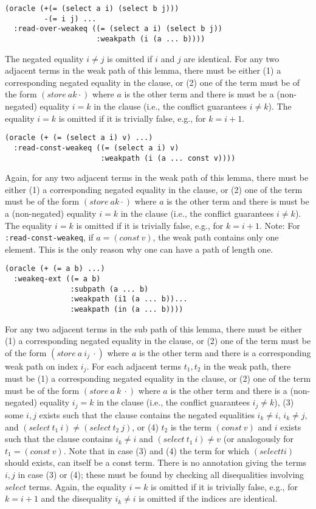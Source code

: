 \documentclass[a4paper]{article}
\begin{document}
\begin{verbatim}
(oracle (+(= (select a i) (select b j)))
         -(= i j) ...
  :read-over-weakeq ((= (select a i) (select b j))
                     :weakpath (i (a ... b))))
\end{verbatim}
The negated equality $i\neq j$ is omitted if $i$ and $j$ are identical.
For any two adjacent terms in the weak path of this lemma, there must be either
(1) a corresponding negated equality in the clause, or (2) one of the term must be of
the form $(store\ a k \cdot)$ where $a$ is the other term and there is must be
a (non-negated) equality $i=k$ in the clause (i.e., the conflict guarantees $i\neq k$).
The equality $i=k$ is omitted if it is trivially false, e.g., for $k = i+1$.

\begin{verbatim}
(oracle (+ (= (select a i) v) ...)
  :read-const-weakeq ((= (select a i) v)
                      :weakpath (i (a ... const v))))
\end{verbatim}
Again, for any two adjacent terms in the weak path of this lemma, there must be either
(1) a corresponding negated equality in the clause, or (2) one of the term must be of
the form $(store\ a k \cdot)$ where $a$ is the other term and there is must be
a (non-negated) equality $i=k$ in the clause (i.e., the conflict guarantees $i\neq k$).
The equality $i=k$ is omitted if it is trivially false, e.g., for $k = i+1$.
Note: For \verb+:read-const-weakeq+, if $a = (const\ v)$, the weak path
contains only one element.  This is the only reason why one can have a
path of length one.
\begin{verbatim}
(oracle (+ (= a b) ...)
  :weakeq-ext ((= a b)
               :subpath (a ... b)
               :weakpath (i1 (a ... b))...
               :weakpath (in (a ... b))))
\end{verbatim}
For any two adjacent terms in the sub path of this lemma, there must be either
(1) a corresponding negated equality in the clause, or (2) one of the term must be of
the form $(store\ a\ i_j\ \cdot)$ where $a$ is the other term and there is a corresponding
weak path on index $i_j$.  For each adjacent terms $t_1,t_2$ in the weak path, there must be
(1) a corresponding negated equality in the clause, or (2) one of the term must be of
the form $(store\ a\ k\ \cdot)$ where $a$ is the other term and there is a
(non-negated) equality $i_j=k$ in the clause (i.e., the conflict guarantees $i_j\neq k$),
(3) some $i,j$ exists such that the clause contains the negated equalities
$i_k\neq i$, $i_k\neq j$, and $(select\ t_1\ i) \neq (select\ t_2\ j)$, or
(4) $t_2$ is the term $(const\ v)$ and $i$ exists such that the clause contains
$i_k\neq i$ and $(select\ t_1\ i) \neq v$ (or analogously for $t_1=(const\ v)$.
Note that in case (3) and (4) the term for which $(select t i)$ should exists, can itself
be a const term.  There is no annotation giving the terms $i,j$ in case (3) or (4); these
must be found by checking all disequalities involving $select$ terms.
Again, the equality $i=k$ is omitted if it is trivially false, e.g., for $k = i+1$ and the
disequality $i_k \neq i$ is omitted if the indices are identical.
\end{document}

